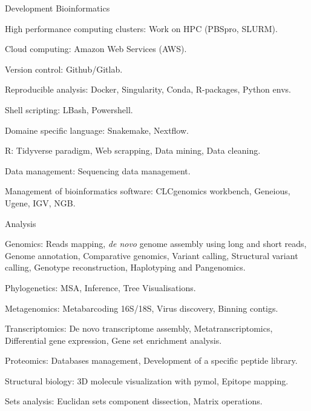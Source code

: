 \begin{cventries}
  \cventry
    {Development} %
    {Bioinformatics} %
    {} %
    {} %
    {
      \begin{cvitems} %
        \item {High performance computing clusters: Work on HPC (PBSpro, SLURM).}
        \item {Cloud computing: Amazon Web Services (AWS).}
        \item {Version control: Github/Gitlab.}
        \item {Reproducible analysis: Docker, Singularity, Conda, R-packages, Python envs.}
        \item {Shell scripting: LBash, Powershell.}
        \item {Domaine specific language: Snakemake, Nextflow.}
        \item {R: Tidyverse paradigm, Web scrapping, Data mining, Data cleaning.}
        \item {Data management: Sequencing data management.}
        \item {Management of bioinformatics software: CLCgenomics workbench, Geneious, Ugene, IGV, NGB.}
      \end{cvitems}
    }

  \cventry
    {Analysis} %
    {} %
    {} %
    {} %
    {
      \begin{cvitems} %
        \item {Genomics: Reads mapping, \textit{de novo} genome assembly using long and short reads, Genome annotation, Comparative genomics, Variant calling, Structural variant calling, Genotype reconstruction, Haplotyping and Pangenomics.}
        \item {Phylogenetics: MSA, Inference, Tree Visualisations.}
        \item {Metagenomics: Metabarcoding 16S/18S, Virus discovery, Binning contigs.}
        \item {Transcriptomics: De novo transcriptome assembly, Metatranscriptomics, Differential gene expression, Gene set enrichment analysis.}
        \item {Proteomics: Databases management, Development of a specific peptide library.}
        \item {Structural biology: 3D molecule visualization with pymol, Epitope mapping.}
        \item {Sets analysis: Euclidan sets component dissection, Matrix operations.}
      \end{cvitems}
    }


\end{cventries}